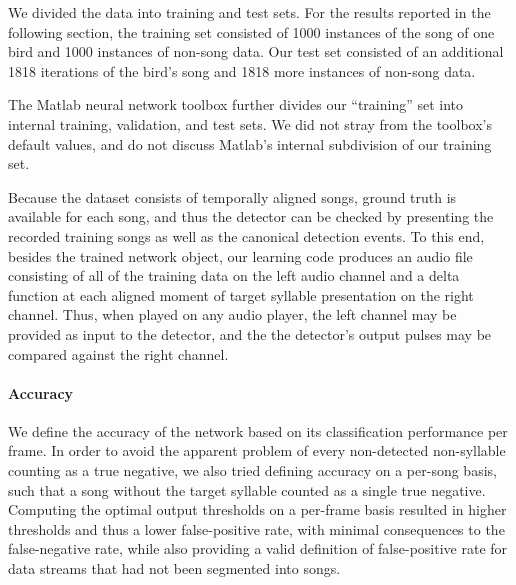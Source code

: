 \documentclass[10pt,letterpaper]{article}
\let\oldmarginpar\marginpar
\renewcommand{\marginpar}[1]{\oldmarginpar{\linespread{1}\scriptsize{#1}}}
\renewcommand{\subsubsection}[1]{\paragraph{#1}}
\begin{document}
We divided the data into training and test sets.  For the results reported in the following section, the training set consisted of 1000 instances of the song of one bird and 1000 instances of non-song data.  Our test set consisted of an additional 1818 iterations of the bird's song and 1818 more instances of non-song data.

The Matlab neural network toolbox further divides our ``training'' set into internal training, validation, and test sets.  We did not stray from the toolbox's default values, and do not discuss Matlab's internal subdivision of our training set.

Because the dataset consists of temporally aligned songs, ground truth is available for each song, and thus the detector can be checked by
presenting the recorded training songs as well as the canonical
detection events. To this end, besides the trained network object, our
learning code produces an audio file consisting of all of the training
data on the left audio channel and a delta function at each aligned moment of
target syllable presentation on the right channel. Thus, when
played on any audio player, the left channel may be provided as input
to the detector, and the the detector's output pulses may be compared against the right channel.


\subsubsection{Accuracy}
\label{sec:accuracy}

We define the accuracy of the network based on its classification performance per frame. In order to avoid the apparent problem of every non-detected non-syllable counting as a true negative, we also tried defining accuracy on a per-song basis, such that a song without the target syllable counted as a single true negative.  Computing the optimal output thresholds on a per-frame basis resulted in higher thresholds and thus a lower false-positive rate, with minimal consequences to the false-negative rate, while also providing a valid definition of false-positive rate for data streams that had not been segmented into songs.



\end{document}
